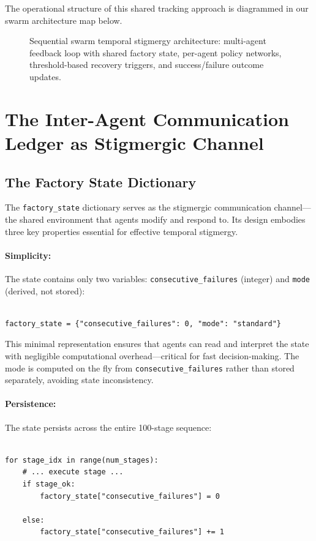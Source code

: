 \documentclass[12pt,a4paper,oneside]{report}
\begin{document}
The operational structure of this shared tracking approach is diagrammed in our swarm architecture map below.
\begin{figure}[H]
    \centering
    
    \caption{Sequential swarm temporal stigmergy architecture: multi-agent feedback loop with shared factory state, per-agent policy networks, threshold-based recovery triggers, and success/failure outcome updates.}
    \label{fig:swarm_control_loop_flowchart}
\end{figure}
\section{The Inter-Agent Communication Ledger as Stigmergic Channel}
\subsection{The Factory State Dictionary}
\label{subsec:the_factory_state_dictionary}

The \texttt{factory\_state} dictionary serves as the stigmergic communication channel---the shared environment that agents modify and respond to. Its design embodies three key properties essential for effective temporal stigmergy.
\paragraph{Simplicity:} The state contains only two variables: \texttt{consecutive\_failures} (integer) and \texttt{mode} (derived, not stored):
\begin{verbatim}

factory_state = {"consecutive_failures": 0, "mode": "standard"}
\end{verbatim}

This minimal representation ensures that agents can read and interpret the state with negligible computational overhead---critical for fast decision-making. The mode is computed on the fly from \texttt{consecutive\_failures} rather than stored separately, avoiding state inconsistency.
\paragraph{Persistence:} The state persists across the entire 100-stage sequence:
\begin{verbatim}

for stage_idx in range(num_stages):
    # ... execute stage ...
    if stage_ok:
        factory_state["consecutive_failures"] = 0

    else:
        factory_state["consecutive_failures"] += 1

\end{verbatim}
\end{document}
